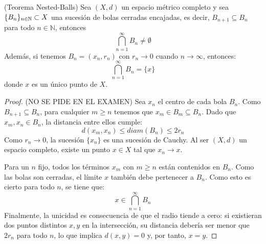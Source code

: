 \begin{teo}(Teorema Nested-Balls)
    Sea $(X, d)$ un espacio métrico completo y sea $\{B_n\}_{n\in \mathbb{N}}\subset X$ una sucesión de bolas cerradas encajadas, es decir, $B_{n+1} \subseteq B_n$ para todo $n \in \mathbb{N}$, entonces
    \begin{equation*}
        \bigcap_{n=1}^{\infty} B_n \neq \emptyset
    \end{equation*} 
    Además, si tenemos $B_n=(x_n, r_n)$ con $r_n \to 0$ cuando $n \to \infty$, entonces:
    \begin{equation*}
        \bigcap_{n=1}^{\infty} B_n = \{x\}
    \end{equation*}
    donde $x$ es un único punto de $X$.

\begin{proof} (NO SE PIDE EN EL EXAMEN)
    Sea $x_n$ el centro de cada bola $B_n$. Como $B_{n+1} \subseteq B_n$, para cualquier $m \geq n$ tenemos que $x_m \in B_m \subseteq B_n$.
    Dado que $x_m, x_n \in B_n$, la distancia entre ellos cumple:
    \begin{equation*}
        d(x_m, x_n) \leq diam(B_n) \leq 2r_n
    \end{equation*}
    Como $r_n \to 0$, la sucesión $\{x_n\}$ es una sucesión de Cauchy. Al ser $(X, d)$ un espacio completo, existe un punto $x \in X$ tal que $x_n \to x$.

    Para un $n$ fijo, todos los términos $x_m$ con $m \geq n$ están contenidos en $B_n$. Como las bolas son cerradas, el límite $x$ también debe pertenecer a $B_n$. Como esto es cierto para todo $n$, se tiene que:
    \begin{equation*}
        x \in \bigcap_{n=1}^{\infty} B_n
    \end{equation*}
    Finalmente, la unicidad es consecuencia de que el radio tiende a cero: si existieran dos puntos distintos $x, y$ en la intersección, su distancia debería ser menor que $2r_n$ para todo $n$, lo que implica $d(x,y) = 0$ y, por tanto, $x=y$.
\end{proof}
\end{teo}

